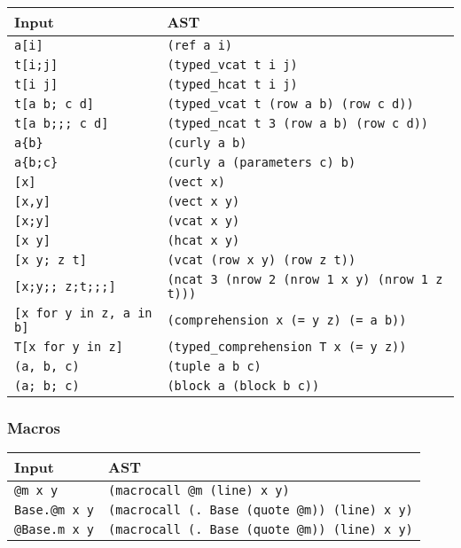 \begin{table}[h]

\begin{tabulary}{\linewidth}{|L|L|}
\hline
Input & AST \\
\hline
\texttt{a[i]} & \texttt{(ref a i)} \\
\hline
\texttt{t[i;j]} & \texttt{(typed\_vcat t i j)} \\
\hline
\texttt{t[i j]} & \texttt{(typed\_hcat t i j)} \\
\hline
\texttt{t[a b; c d]} & \texttt{(typed\_vcat t (row a b) (row c d))} \\
\hline
\texttt{t[a b;;; c d]} & \texttt{(typed\_ncat t 3 (row a b) (row c d))} \\
\hline
\texttt{a\{b\}} & \texttt{(curly a b)} \\
\hline
\texttt{a\{b;c\}} & \texttt{(curly a (parameters c) b)} \\
\hline
\texttt{[x]} & \texttt{(vect x)} \\
\hline
\texttt{[x,y]} & \texttt{(vect x y)} \\
\hline
\texttt{[x;y]} & \texttt{(vcat x y)} \\
\hline
\texttt{[x y]} & \texttt{(hcat x y)} \\
\hline
\texttt{[x y; z t]} & \texttt{(vcat (row x y) (row z t))} \\
\hline
\texttt{[x;y;; z;t;;;]} & \texttt{(ncat 3 (nrow 2 (nrow 1 x y) (nrow 1 z t)))} \\
\hline
\texttt{[x for y in z, a in b]} & \texttt{(comprehension x (= y z) (= a b))} \\
\hline
\texttt{T[x for y in z]} & \texttt{(typed\_comprehension T x (= y z))} \\
\hline
\texttt{(a, b, c)} & \texttt{(tuple a b c)} \\
\hline
\texttt{(a; b; c)} & \texttt{(block a (block b c))} \\
\hline
\end{tabulary}

\end{table}



\hypertarget{7735912728489467540}{}


\subsubsection{Macros}




\begin{table}[h]

\begin{tabulary}{\linewidth}{|L|L|}
\hline
Input & AST \\
\hline
\texttt{@m x y} & \texttt{(macrocall @m (line) x y)} \\
\hline
\texttt{Base.@m x y} & \texttt{(macrocall (. Base (quote @m)) (line) x y)} \\
\hline
\texttt{@Base.m x y} & \texttt{(macrocall (. Base (quote @m)) (line) x y)} \\
\hline
\end{tabulary}

\end{table}



